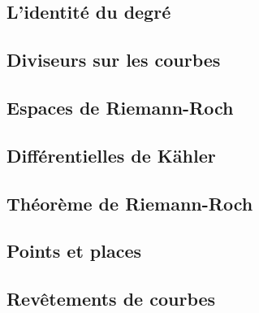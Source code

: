 	


\subsection{L'identité du degré}

	


\subsection{Diviseurs sur les courbes}

	


\subsection{Espaces de Riemann-Roch}

	


\subsection{Différentielles de Kähler}

	


\subsection{Théorème de Riemann-Roch}

	


\subsection{Points et places}

	


\subsection{Revêtements de courbes}

	
